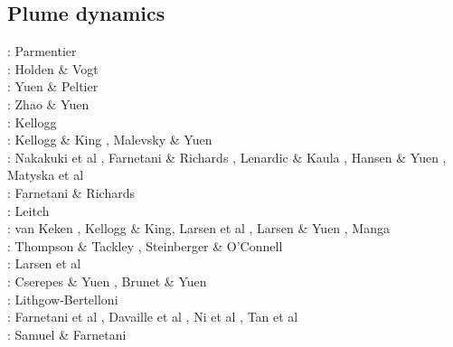 \subsection{Plume dynamics}

\begin{scriptsize}
\noindent
\nineteenseventyfive: Parmentier \etal \cite{patt75}\\
\nineteenseventyseven: Holden \& Vogt \cite{hovo77}\\
\nineteeneighty: Yuen \& Peltier \cite{yupe80}\\
\nineteeneightyseven: Zhao \& Yuen \cite{zhyu87}\\
\nineteenninetyone: Kellogg \cite{kell91}\\
\nineteenninetythree: Kellogg \& King \cite{keki93}, Malevsky \& Yuen \cite{mayu93}\\
\nineteenninetyfour: Nakakuki et al \cite{nasf94}, Farnetani \& Richards \cite{fari94},
                     Lenardic \& Kaula \cite{leka94b}, Hansen \& Yuen \cite{hayu94},
                     Matyska et al \cite{mamy94}\\
\nineteenninetyfive: Farnetani \& Richards \cite{fari95}\\
\nineteenninetysix: Leitch \etal \cite{lesy96} \\
\nineteenninetyseven: van Keken \cite{vank97}, Kellogg \& King\cite{keki97},
                      Larsen et al \cite{laym97}, Larsen \& Yuen \cite{layu97,layu97b},
                      Manga \cite{mang97}\\
\nineteenninetyeight: Thompson \& Tackley \cite{thta98}, Steinberger \& O'Connell \cite{stoc98}\\
\nineteenninetynine: Larsen et al \cite{lays99}\\
\twothousand: Cserepes \& Yuen \cite{csyu00}, Brunet \& Yuen \cite{bryu00}\\
\twothousandone: Lithgow-Bertelloni \cite{lirc01}\\
\twothousandtwo: Farnetani et al \cite{falt02}, Davaille et al \cite{dagl02},
                 Ni et al \cite{nitg02}, Tan et al \cite{tagh02}\\
\twothousandthree: Samuel \& Farnetani \cite{safa03}\\

\end{scriptsize}

